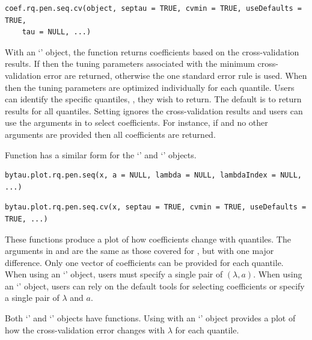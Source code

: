 \begin{verbatim}
coef.rq.pen.seq.cv(object, septau = TRUE, cvmin = TRUE, useDefaults = TRUE,
    tau = NULL, ...)
\end{verbatim}

With an `' object, the  function returns coefficients based on the cross-validation results. If  then the tuning parameters associated with the minimum cross-validation error are returned, otherwise the one standard error rule is used. When  then the tuning parameters are optimized individually for each quantile. Users can identify the specific quantiles, , they wish to return. The default is to return results for all quantiles. Setting  ignores the cross-validation results and users can use the arguments in  to select coefficients. For instance, if  and no other arguments are provided then all coefficients are returned.

Function  has a similar form for the `' and `' objects. \newline

\begin{verbatim}
bytau.plot.rq.pen.seq(x, a = NULL, lambda = NULL, lambdaIndex = NULL, ...)
\end{verbatim}

\begin{verbatim}
bytau.plot.rq.pen.seq.cv(x, septau = TRUE, cvmin = TRUE, useDefaults = TRUE, ...)
\end{verbatim}

These functions produce a plot of how coefficients change with quantiles. The arguments in  and  are the same as those covered for , but with one major difference. Only one vector of coefficients can be provided for each quantile. When using an `' object, users must specify a single pair of \((\lambda,a)\). When using an `' object, users can rely on the default tools for selecting coefficients or specify a single pair of \(\lambda\) and \(a\).

Both `' and `' objects have  functions. Using  with an `' object provides a plot of how the cross-validation error changes with \(\lambda\) for each quantile.

